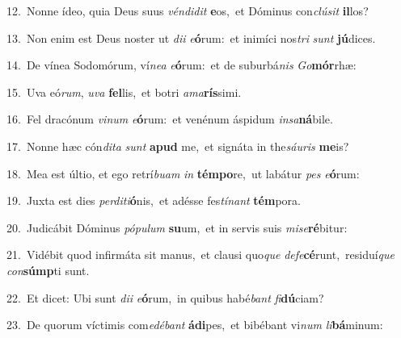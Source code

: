 {\numbfont\textcolor{\numbcolor}{12.}}~Nonne ídeo, quia Deus suus \textit{vén}\-\textit{di}\textit{dit} \textbf{e}\-os,~\star et Dóminus con\-\textit{clú}\-\textit{sit} \textbf{il}\-los?\par
{\numbfont\textcolor{\numbcolor}{13.}}~Non enim est Deus noster ut \textit{di}\-\textit{i} \textit{e}\-\textbf{ó}rum:~\star et inimíci nos\textit{tri} \textit{sunt} \textbf{jú}\-dices.\par
{\numbfont\textcolor{\numbcolor}{14.}}~De vínea Sodomórum, ví\-\textit{ne}\-\textit{a} \textit{e}\-\textbf{ó}rum:~\star et de suburbá\textit{nis} \textit{Go}\-\textbf{mór}rhæ:\par
{\numbfont\textcolor{\numbcolor}{15.}}~Uva eó\-\textit{rum}\-, \textit{u}\-\textit{va} \textbf{fel}\-lis,~\star et botri \textit{a}\-\textit{ma}\textbf{rís}simi.\par
{\numbfont\textcolor{\numbcolor}{16.}}~Fel dracónum \textit{vi}\-\textit{num} \textit{e}\-\textbf{ó}rum:~\star et venénum áspidum \textit{in}\-\textit{sa}\textbf{ná}bile.\par
{\numbfont\textcolor{\numbcolor}{17.}}~Nonne hæc cón\-\textit{di}\-\textit{ta} \textit{sunt} \textbf{a}\-\textbf{pud} me,~\star et signáta in the\-\textit{sáu}\-\textit{ris} \textbf{me}\-is?\par
{\numbfont\textcolor{\numbcolor}{18.}}~Mea est últio, et ego retrí\-\textit{bu}\-\textit{am} \textit{in} \textbf{tém}\-\textbf{po}re,~\star ut labátur \textit{pes} \textit{e}\-\textbf{ó}rum:\par
{\numbfont\textcolor{\numbcolor}{19.}}~Juxta est dies \textit{per}\-\textit{di}\textit{ti}\textbf{ó}nis,~\star et adésse fes\-\textit{tí}\-\textit{nant} \textbf{tém}\-pora.\par
{\numbfont\textcolor{\numbcolor}{20.}}~Judicábit Dóminus \textit{pó}\-\textit{pu}\textit{lum} \textbf{su}\-um,~\star et in servis suis \textit{mi}\-\textit{se}\textbf{ré}bitur:\par
{\numbfont\textcolor{\numbcolor}{21.}}~Vidébit quod infirmáta sit manus,~\dagger et clausi quo\textit{que} \textit{de}\-\textit{fe}\textbf{cé}runt,~\star residuí\textit{que} \textit{con}\-\textbf{súmp}ti sunt.\par
{\numbfont\textcolor{\numbcolor}{22.}}~Et dicet: Ubi sunt \textit{di}\-\textit{i} \textit{e}\-\textbf{ó}rum,~\star in quibus habé\textit{bant} \textit{fi}\-\textbf{dú}ciam?\par
{\numbfont\textcolor{\numbcolor}{23.}}~De quorum víctimis com\-\textit{e}\-\textit{dé}\textit{bant} \textbf{á}\-\textbf{di}pes,~\star et bibébant vi\textit{num} \textit{li}\-\textbf{bá}minum:\par

